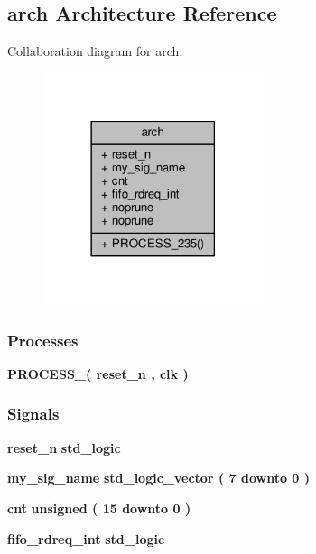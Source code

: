 \subsection{arch Architecture Reference}
\label{classfifo__trnsf_1_1arch}


Collaboration diagram for arch\+:\nopagebreak
\begin{figure}[H]
\begin{center}
\leavevmode
\includegraphics[width=182pt]{da/d73/classfifo__trnsf_1_1arch__coll__graph}
\end{center}
\end{figure}
\subsubsection*{Processes}
 \begin{DoxyCompactItemize}
\item 
{\bf P\+R\+O\+C\+E\+S\+S\+\_}{\bfseries  ( {\bfseries {\bfseries {\bf reset\+\_\+n}} \textcolor{vhdlchar}{ }} , {\bfseries {\bfseries {\bf clk}} \textcolor{vhdlchar}{ }} )}
\end{DoxyCompactItemize}
\subsubsection*{Signals}
 \begin{DoxyCompactItemize}
\item 
{\bf reset\+\_\+n} {\bfseries \textcolor{comment}{std\+\_\+logic}\textcolor{vhdlchar}{ }} 
\item 
{\bf my\+\_\+sig\+\_\+name} {\bfseries \textcolor{comment}{std\+\_\+logic\+\_\+vector}\textcolor{vhdlchar}{ }\textcolor{vhdlchar}{(}\textcolor{vhdlchar}{ }\textcolor{vhdlchar}{ } \textcolor{vhdldigit}{7} \textcolor{vhdlchar}{ }\textcolor{keywordflow}{downto}\textcolor{vhdlchar}{ }\textcolor{vhdlchar}{ } \textcolor{vhdldigit}{0} \textcolor{vhdlchar}{ }\textcolor{vhdlchar}{)}\textcolor{vhdlchar}{ }} 
\item 
{\bf cnt} {\bfseries \textcolor{comment}{unsigned}\textcolor{vhdlchar}{ }\textcolor{vhdlchar}{(}\textcolor{vhdlchar}{ }\textcolor{vhdlchar}{ } \textcolor{vhdldigit}{15} \textcolor{vhdlchar}{ }\textcolor{keywordflow}{downto}\textcolor{vhdlchar}{ }\textcolor{vhdlchar}{ } \textcolor{vhdldigit}{0} \textcolor{vhdlchar}{ }\textcolor{vhdlchar}{)}\textcolor{vhdlchar}{ }} 
\item 
{\bf fifo\+\_\+rdreq\+\_\+int} {\bfseries \textcolor{comment}{std\+\_\+logic}\textcolor{vhdlchar}{ }} 
\end{DoxyCompactItemize}
